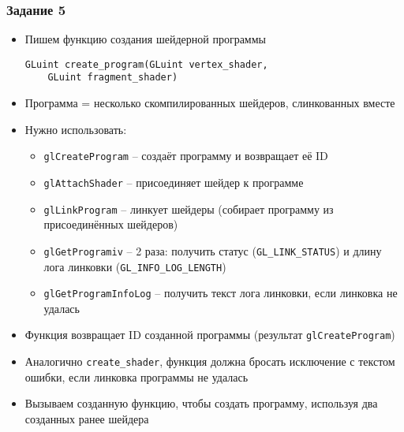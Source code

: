 \documentclass{beamer}
\begin{document}
\begin{frame}[fragile]
\frametitle{Задание 5}
\fontsize{8pt}{8pt}\selectfont
\begin{itemize}
\item Пишем функцию создания шейдерной программы
\begin{verbatim}
GLuint create_program(GLuint vertex_shader,
    GLuint fragment_shader)
\end{verbatim}
\pause
\item Программа = несколько скомпилированных шейдеров, слинкованных вместе
\item Нужно использовать:
\begin{itemize}
\item \verb|glCreateProgram| -- создаёт программу и возвращает её ID
\item \verb|glAttachShader| -- присоединяет шейдер к программе
\item \verb|glLinkProgram| -- линкует шейдеры (собирает программу из присоединённых шейдеров)
\item \verb|glGetProgramiv| -- 2 раза: получить статус (\verb|GL_LINK_STATUS|) и длину лога линковки (\verb|GL_INFO_LOG_LENGTH|)
\item \verb|glGetProgramInfoLog| -- получить текст лога линковки, если линковка не удалась
\end{itemize}
\pause
\item Функция возвращает ID созданной программы (результат \verb|glCreateProgram|)
\pause
\item Аналогично \verb|create_shader|, функция должна бросать исключение с текстом ошибки, если линковка программы не удалась
\pause
\item Вызываем созданную функцию, чтобы создать программу, используя два созданных ранее шейдера
\end{itemize}
\end{frame}
\end{document}
